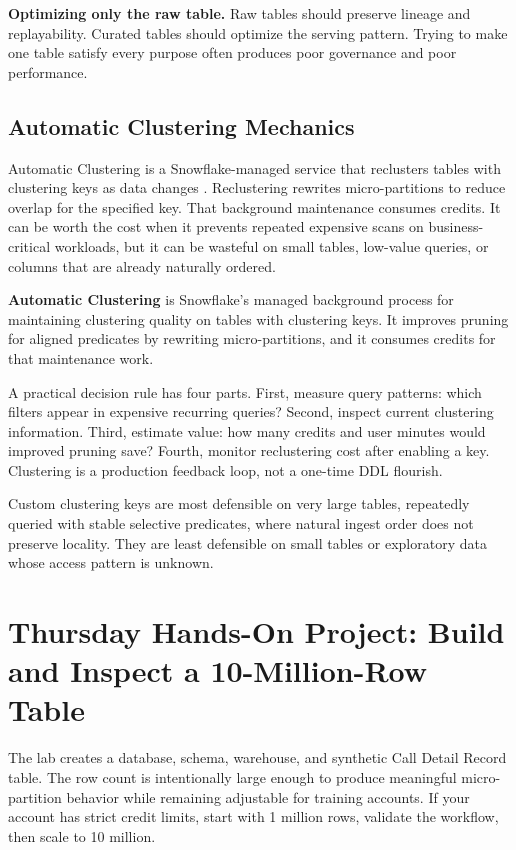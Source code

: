 \begin{pitfall}
\textbf{Optimizing only the raw table.} Raw tables should preserve lineage and replayability. Curated tables should optimize the serving pattern. Trying to make one table satisfy every purpose often produces poor governance and poor performance.
\end{pitfall}

\subsection{Automatic Clustering Mechanics}
Automatic Clustering is a Snowflake-managed service that reclusters tables with clustering keys as data changes \cite{snowflakeAutomaticClusteringDocs}. Reclustering rewrites micro-partitions to reduce overlap for the specified key. That background maintenance consumes credits. It can be worth the cost when it prevents repeated expensive scans on business-critical workloads, but it can be wasteful on small tables, low-value queries, or columns that are already naturally ordered.

\begin{definitionbox}
\textbf{Automatic Clustering} is Snowflake's managed background process for maintaining clustering quality on tables with clustering keys. It improves pruning for aligned predicates by rewriting micro-partitions, and it consumes credits for that maintenance work.
\end{definitionbox}

A practical decision rule has four parts. First, measure query patterns: which filters appear in expensive recurring queries? Second, inspect current clustering information. Third, estimate value: how many credits and user minutes would improved pruning save? Fourth, monitor reclustering cost after enabling a key. Clustering is a production feedback loop, not a one-time DDL flourish.

\begin{notebox}
Custom clustering keys are most defensible on very large tables, repeatedly queried with stable selective predicates, where natural ingest order does not preserve locality. They are least defensible on small tables or exploratory data whose access pattern is unknown.
\end{notebox}

\section{Thursday Hands-On Project: Build and Inspect a 10-Million-Row Table}
The lab creates a database, schema, warehouse, and synthetic Call Detail Record table. The row count is intentionally large enough to produce meaningful micro-partition behavior while remaining adjustable for training accounts. If your account has strict credit limits, start with 1 million rows, validate the workflow, then scale to 10 million.

